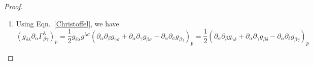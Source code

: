 \documentclass[a4paper]{article}
\theoremstyle{new}
\begin{document}
\begin{proof}
\begin{enumerate}
\begin{align}
        (\nabla_\lambda \tensor*{R}{*_{}^{\mu}_{\nu\rho\sigma}})_p&=(\partial_\lambda(\partial_\rho\Gamma^\mu_{\nu\sigma}-\partial_\sigma\Gamma^\mu_{\nu\rho}+\Gamma^t_{\nu\sigma}\Gamma^\mu_{t\rho}-\Gamma^t_{\nu\rho}\Gamma^\mu_{t\sigma}))_p\nonumber\\&=(-\partial_\lambda\partial_\nu\Gamma^\mu_{\rho\sigma}+\partial_\lambda\partial_\rho\Gamma^\mu_{\nu\sigma})_p\nonumber
    \end{align}
    Fully anti-symmetrize:
    \begin{eqnarray}
    &&(\nabla_{[\lambda|}\tensor*{R}{*_{}^{\mu}_{\nu|\rho\sigma]}})_p\nonumber\\&=&(\nabla_\lambda \tensor*{R}{*_{}^{\mu}_{\nu\rho\sigma}})_p+(\nabla_\rho \tensor*{R}{*_{}^{\mu}_{\nu\sigma\lambda}})_p+(\nabla_\sigma \tensor*{R}{*_{}^{\mu}_{\nu\lambda\rho}})_p-(\nabla_\rho \tensor*{R}{*_{}^{\mu}_{\nu\lambda\sigma}})_p-(\nabla_\sigma \tensor*{R}{*_{}^{\mu}_{\nu\rho\lambda}})_p-(\nabla_\lambda \tensor*{R}{*_{}^{\mu}_{\nu\sigma\rho}})_p\nonumber\\&=&(-\partial_\lambda\partial_\nu\Gamma^\mu_{\rho\sigma}+\partial_\lambda\partial_\rho\Gamma^\mu_{\nu\sigma})_p+(-\partial_\rho\partial_\nu\Gamma^\mu_{\sigma\lambda}+\partial_\rho\partial_\sigma\Gamma^\mu_{\nu\lambda})_p+(-\partial_\sigma\partial_\nu\Gamma^\mu_{\lambda\rho}+\partial_\sigma\partial_\lambda\Gamma^\mu_{\nu\rho})_p\nonumber\\&&-(-\partial_\rho\partial_\nu\Gamma^\mu_{\lambda\sigma}+\partial_\rho\partial_\lambda\Gamma^\mu_{\nu\sigma})_p-(-\partial_\sigma\partial_\nu\Gamma^\mu_{\rho\lambda}+\partial_\sigma\partial_\rho\Gamma^\mu_{\nu\lambda})_p-(-\partial_\lambda\partial_\nu\Gamma^\mu_{\sigma\rho}+\partial_\lambda\partial_\sigma\Gamma^\mu_{\nu\rho})_p=0\nonumber
    \end{eqnarray}
    Since symmetries are preserved under general coordinate transformations, and given that $p\in\mathcal{M}$ is arbitrary, any symmetry of the components $R_{abcd}$ in local Cartesian coordinates at $p$ will imply a general symmetry of the Riemann tensor.
    \item Using Eqn.~\ref{Christoffel}, we have
    $$(g_{\delta\lambda}\partial_\alpha\Gamma^\lambda_{\beta\gamma})_p=\frac{1}{2}g_{\delta\lambda}g^{\lambda\sigma}(\partial_\alpha\partial_\beta g_{\gamma \sigma}+\partial_\alpha\partial_\gamma g_{\beta\sigma}-\partial_\alpha\partial_\sigma g_{\beta\gamma})_p=\frac{1}{2}(\partial_\alpha\partial_\beta g_{\gamma\delta}+\partial_\alpha\partial_\gamma g_{\beta\delta}-\partial_\alpha\partial_\delta g_{\beta\gamma})_p$$

\end{enumerate}
\end{proof}
\end{document}

